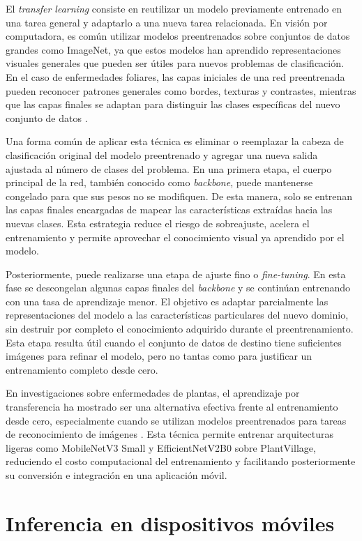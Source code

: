El \textit{transfer learning} consiste en reutilizar un modelo previamente entrenado en una tarea general y adaptarlo a una nueva tarea
relacionada. En visión por computadora, es común utilizar modelos preentrenados sobre conjuntos de datos grandes como ImageNet, ya que
estos modelos han aprendido representaciones visuales generales que pueden ser útiles para nuevos problemas de clasificación. En el caso
de enfermedades foliares, las capas iniciales de una red preentrenada pueden reconocer patrones generales como bordes, texturas y
contrastes, mientras que las capas finales se adaptan para distinguir las clases específicas del nuevo conjunto de datos \cite{amin2022end}.

Una forma común de aplicar esta técnica es eliminar o reemplazar la cabeza de clasificación original del modelo preentrenado y agregar una
nueva salida ajustada al número de clases del problema. En una primera etapa, el cuerpo principal de la red, también conocido como
\textit{backbone}, puede mantenerse congelado para que sus pesos no se modifiquen. De esta manera, solo se entrenan las capas finales
encargadas de mapear las características extraídas hacia las nuevas clases. Esta estrategia reduce el riesgo de sobreajuste, acelera el
entrenamiento y permite aprovechar el conocimiento visual ya aprendido por el modelo.

Posteriormente, puede realizarse una etapa de ajuste fino o \textit{fine-tuning}. En esta fase se descongelan algunas capas finales del
\textit{backbone} y se continúan entrenando con una tasa de aprendizaje menor. El objetivo es adaptar parcialmente las representaciones
del modelo a las características particulares del nuevo dominio, sin destruir por completo el conocimiento adquirido durante el
preentrenamiento. Esta etapa resulta útil cuando el conjunto de datos de destino tiene suficientes imágenes para refinar el modelo, pero
no tantas como para justificar un entrenamiento completo desde cero.

En investigaciones sobre enfermedades de plantas, el aprendizaje por transferencia ha mostrado ser una alternativa efectiva frente al
entrenamiento desde cero, especialmente cuando se utilizan modelos preentrenados para tareas de reconocimiento de imágenes \cite{Ahmad2023}.
Esta técnica permite entrenar arquitecturas ligeras como MobileNetV3 Small y EfficientNetV2B0 sobre
PlantVillage, reduciendo el costo computacional del entrenamiento y facilitando posteriormente su conversión e integración en una
aplicación móvil.

\section{Inferencia en dispositivos móviles}

